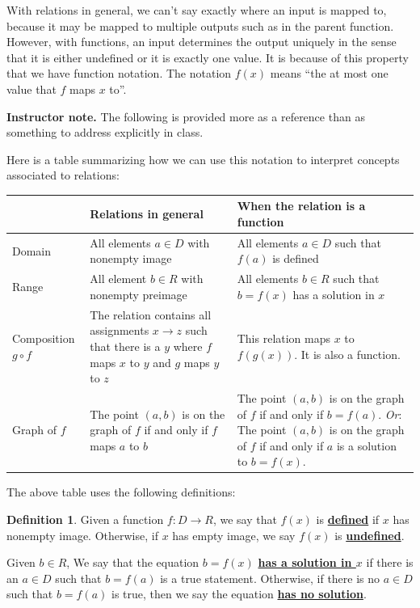 \documentclass[11pt]{article}
\newcommand\smallnote[1]
	{\begin{mdframed}\raggedright  {\bf Instructor note.} {#1} \end{mdframed}}
\renewcommand\emph[1]{\underline{\bf{#1}}} %
\theoremstyle{definition}
\newtheorem{definition}[theorem]{Definition}
\begin{document}
\vspace*{-6pt}
With relations in general, we can't say exactly where an input is mapped to, because it may be mapped to multiple outputs such as in the parent function. However, with functions, an input determines the output uniquely in the sense that it is either undefined or it is exactly one value. It is because of this property that we have function notation. The notation $f(x)$ means ``the at most one value that $f$ maps $x$ to''.

\smallnote{
 The following is provided more as a reference than as something to address explicitly in class. }

Here is a table summarizing how we can use this notation to interpret concepts associated to relations:

\begin{tabular}{L{1in}L{2.5in}|L{2.5in}}
	& Relations in general & When the relation is a function \\ \hline
Domain &  All elements $a\in D$ with nonempty image 
	& All elements $a\in D$ such that $f(a)$ is defined \\
Range & All element $b \in R$ with nonempty preimage
	 & All elements $b\in R$ such that $b=f(x)$ has a solution in $x$ \\
Composition $g\circ f$ & The relation contains all assignments $x\to z$ such that there is a $y$ where $f$ maps $x$ to $y$ and $g$ maps $y$ to $z$  
	& This relation maps $x$ to $f(g(x))$. It is also a function. \\ 
Graph of $f$ & The point $(a,b)$ is on the graph of $f$ if and only if $f$ maps $a$ to $b$
	& The point $(a,b)$ is on the graph of $f$ if and only if $b=f(a)$. 
	{\it Or}: The point $(a,b)$ is on the graph of $f$ if and only if $a$ is a solution to $b=f(x)$. \\
\end{tabular}

The above table uses the following definitions:

\begin{definition}
Given a function $f:D\to R$, we say that $f(x)$ is \emph{defined} if $x$ has nonempty image. Otherwise, if $x$ has empty image, we say $f(x)$ is \emph{undefined}.

Given $b\in R$, We say that the equation $b=f(x)$ \emph{has a solution in $x$} if there is an $a\in D$ such that $b=f(a)$ is a true statement. Otherwise, if there is no $a\in D$ such that $b=f(a)$ is true, then we say the equation \emph{has no solution}.
\end{definition}
\end{document}
